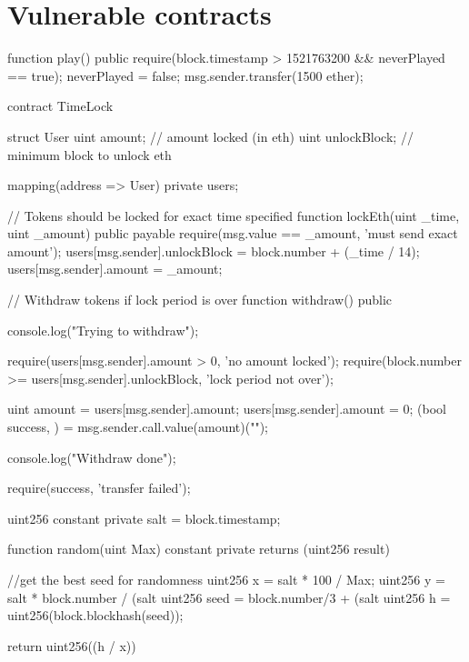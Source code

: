 \section{Vulnerable contracts}

\begin{solidity}[caption=NCC Group - Time manipulation \cite{DASP2018}]
    function play() public {
        require(block.timestamp > 1521763200 && neverPlayed == true);
        neverPlayed = false;
        msg.sender.transfer(1500 ether);
    }
\end{solidity}

\begin{solidity}[caption=SWC116 \cite{swc116}]
contract TimeLock {
    struct User {
        uint amount; // amount locked (in eth)
        uint unlockBlock; // minimum block to unlock eth
    }

    mapping(address => User) private users;

    // Tokens should be locked for exact time specified
    function lockEth(uint _time, uint _amount) public payable {
        require(msg.value == _amount, 'must send exact amount');
        users[msg.sender].unlockBlock = block.number + (_time / 14);
        users[msg.sender].amount = _amount;
    }

    // Withdraw tokens if lock period is over
    function withdraw() public {
        console.log("Trying to withdraw");

        require(users[msg.sender].amount > 0, 'no amount locked');
        require(block.number >= users[msg.sender].unlockBlock, 'lock period not over');

        uint amount = users[msg.sender].amount;
        users[msg.sender].amount = 0;
        (bool success, ) = msg.sender.call.value(amount)("");

        console.log("Withdraw done");

        require(success, 'transfer failed');
    }
}
\end{solidity}

\begin{solidity}[caption=The Run smart contract \cite{therun_contract}]
    uint256 constant private salt =  block.timestamp;
    
    function random(uint Max) constant private returns (uint256 result){
        //get the best seed for randomness
        uint256 x = salt * 100 / Max;
        uint256 y = salt * block.number / (salt %
        uint256 seed = block.number/3 + (salt %
        uint256 h = uint256(block.blockhash(seed)); 
    
        return uint256((h / x)) %
    }
\end{solidity}
